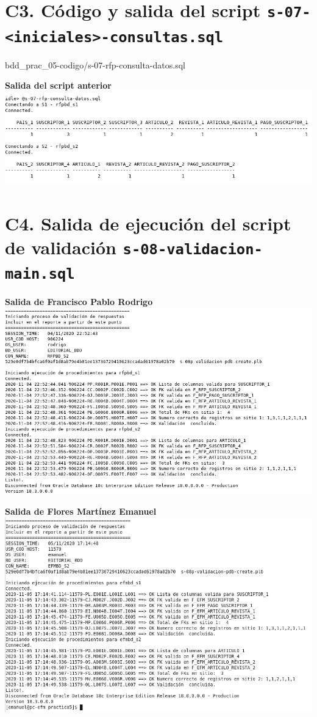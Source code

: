 \documentclass{article}
\begin{document}
\section*{C3. Código y salida del script 
\texttt{s-07-<iniciales>-consultas.sql}}


{bdd_prac_05-codigo/s-07-rfp-consulta-datos.sql}

\newpage
\textbf{Salida del script anterior}\\
\includegraphics[width=\linewidth]{bdd_prac05-c3-consulta-datos}

\section*{C4. Salida de ejecución del script de validación 
\texttt{s-08-validacion-main.sql}}            

\textbf{Salida de Francisco Pablo Rodrigo}\\
\includegraphics[width=\linewidth]{bdd_prac05-validador-rodrigo}

\newpage
\textbf{Salida de Flores Martínez Emanuel}\\[2mm]
\includegraphics[width=\linewidth]{bdd_prac05-validador-emanuel}
\end{document}
